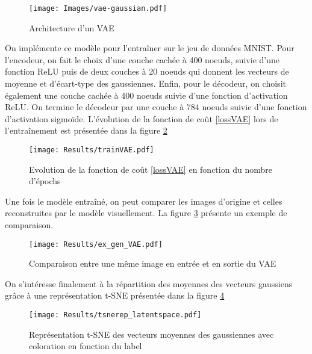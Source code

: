 \documentclass{article}
\begin{document}
\begin{figure}[H]
    \centering
    \texttt{[image: Images/vae-gaussian.pdf]}
    \caption{Architecture d'un VAE \cite{weng2018VAE}}
    \label{schemaVAE}
\end{figure}

On implémente ce modèle pour l'entraîner sur le jeu de données MNIST. Pour l'encodeur, on fait le choix d'une couche cachée à 400 noeuds, suivie d'une fonction ReLU puis de deux couches à 20 noeuds qui donnent les vecteurs de moyenne et d'écart-type des gaussiennes. Enfin, pour le décodeur, on choisit également une couche cachée à 400 noeuds suivie d'une fonction d'activation ReLU. On termine le décodeur par une couche à 784 noeuds suivie d'une fonction d'activation sigmoïde. L'évolution de la fonction de coût \ref{lossVAE} lors de l'entraînement est présentée dans la figure \ref{entt}
\begin{figure}[H]
    \centering
    \texttt{[image: Results/trainVAE.pdf]}
    \caption{Evolution de la fonction de coût \ref{lossVAE} en fonction du nombre d'épochs}
    \label{entt}
\end{figure}

Une fois le modèle entraîné, on peut comparer les images d'origine et celles reconstruites par le modèle visuellement. La figure \ref{comp} présente un exemple de comparaison. 
\begin{figure}[H]
    \centering
    \texttt{[image: Results/ex\_gen\_VAE.pdf]}
    \caption{Comparaison entre une même image en entrée et en sortie du VAE}
    \label{comp}
\end{figure}
On s'intéresse finalement à la répartition des moyennes des vecteurs gaussiens grâce à une représentation t-SNE présentée dans la figure \ref{tsne}
\begin{figure}[H]
    \centering
    \texttt{[image: Results/tsnerep\_latentspace.pdf]}
    \caption{Représentation t-SNE des vecteurs moyennes des gaussiennes avec coloration en fonction du label}
    \label{tsne}
\end{figure}
\end{document}
